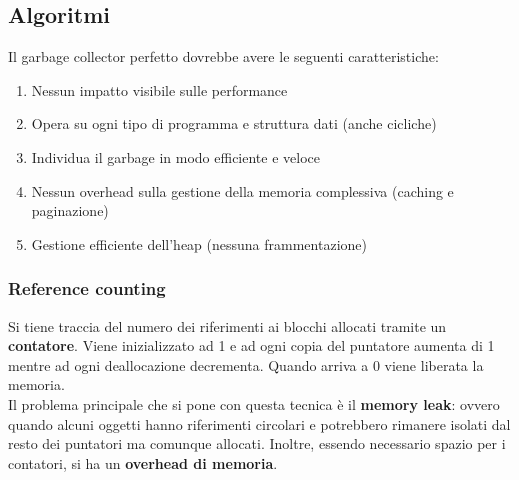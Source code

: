 \subsection{Algoritmi}
Il garbage collector perfetto dovrebbe avere le seguenti caratteristiche:
\begin{enumerate}
	\item Nessun impatto visibile sulle performance
	\item Opera su ogni tipo di programma e struttura dati (anche cicliche)
	\item Individua il garbage in modo efficiente e veloce
	\item Nessun overhead sulla gestione della memoria complessiva (caching e paginazione)
	\item Gestione efficiente dell'heap (nessuna frammentazione)
\end{enumerate}
\subsubsection{Reference counting}
Si tiene traccia del numero dei riferimenti ai blocchi allocati tramite un \textbf{contatore}. Viene inizializzato ad 1 e ad ogni copia del puntatore aumenta di 1 mentre ad ogni deallocazione decrementa. Quando arriva a 0 viene liberata la memoria.\\
Il problema principale che si pone con questa tecnica è il \textbf{memory leak}: ovvero quando alcuni oggetti hanno riferimenti circolari e potrebbero rimanere isolati dal resto dei puntatori ma comunque allocati. Inoltre, essendo necessario spazio per i contatori, si ha un \textbf{overhead di memoria}.

